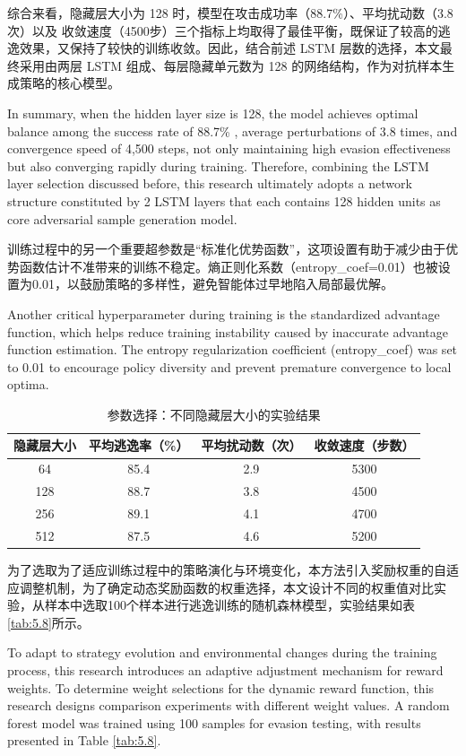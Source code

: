 综合来看，隐藏层大小为 128 时，模型在攻击成功率（88.7\%）、平均扰动数（3.8次）以及 收敛速度（4500步）三个指标上均取得了最佳平衡，既保证了较高的逃逸效果，又保持了较快的训练收敛。因此，结合前述 LSTM 层数的选择，本文最终采用由两层 LSTM 组成、每层隐藏单元数为 128 的网络结构，作为对抗样本生成策略的核心模型。

In summary, when the hidden layer size is 128, the model achieves optimal balance among the success rate of 88.7\% , average perturbations of 3.8 times, and convergence speed of 4,500 steps, not only maintaining high evasion effectiveness but also converging rapidly during training. Therefore, combining the LSTM layer selection discussed before, this research ultimately adopts a network structure constituted by 2 LSTM layers that each contains 
128 hidden units as core adversarial sample generation model.

训练过程中的另一个重要超参数是“标准化优势函数”，这项设置有助于减少由于优势函数估计不准带来的训练不稳定。熵正则化系数（entropy\_coef=0.01）也被设置为0.01，以鼓励策略的多样性，避免智能体过早地陷入局部最优解。

Another critical hyperparameter during training is the standardized advantage function, which helps reduce training instability caused by inaccurate advantage function estimation. The entropy regularization coefficient (entropy\_coef) was set to 0.01 to encourage policy diversity and prevent premature convergence to local optima.

\begin{table}[htbp]
	\centering
	\caption{参数选择：不同隐藏层大小的实验结果}
	\label{tab:5.7}
	\begin{tabular*}{0.9\textwidth}{@{\extracolsep{\fill}}cccc}
		\toprule
		隐藏层大小 & 平均逃逸率（\%） & 平均扰动数（次） & 收敛速度（步数） \\
		\midrule
		64  & 85.4 & 2.9 & 5300 \\
		128 & 88.7 & 3.8 & 4500 \\
		256 & 89.1 & 4.1 & 4700 \\
		512 & 87.5 & 4.6 & 5200 \\
		\bottomrule
	\end{tabular*}
\end{table}

为了选取为了适应训练过程中的策略演化与环境变化，本方法引入奖励权重的自适应调整机制，为了确定动态奖励函数的权重选择，本文设计不同的权重值对比实验，从样本中选取100个样本进行逃逸训练的随机森林模型，实验结果如表\ref{tab:5.8}所示。

To adapt to strategy evolution and environmental changes during the training process, this research introduces an adaptive adjustment mechanism for reward weights. To determine weight selections for the dynamic reward function, this research designs comparison experiments with different weight values. A random forest model was trained using 100 samples for evasion testing, with results presented in Table \ref{tab:5.8}.


